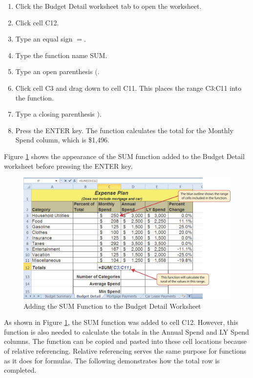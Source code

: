 \begin{enumerate}
	\item Click the Budget Detail worksheet tab to open the worksheet.
	\item Click cell \textsf{C12}.
	\item Type an equal sign $ = $.
	\item Type the function name SUM.
	\item Type an open parenthesis $ ( $.
	\item Click cell \textsf{C3} and drag down to cell \textsf{C11}. This places the range \textsf{C3:C11} into the function.
	\item Type a closing parenthesis $ ) $.
	\item Press the ENTER key. The function calculates the total for the Monthly Spend column, which is \$1,496.
\end{enumerate}

Figure \ref{02:fig11} shows the appearance of the SUM function added to the Budget Detail worksheet before pressing the ENTER key.

\begin{figure}[H]
	\centering
	\includegraphics[width=\maxwidth{.95\linewidth}]{gfx/ch02_fig11}
	\caption{Adding the SUM Function to the Budget Detail Worksheet}
	\label{02:fig11}
\end{figure}

As shown in Figure \ref{02:fig11}, the SUM function was added to cell \textsf{C12}. However, this function is also needed to calculate the totals in the Annual Spend and LY Spend columns. The function can be copied and pasted into these cell locations because of relative referencing. Relative referencing serves the same purpose for functions as it does for formulas. The following demonstrates how the total row is completed.

